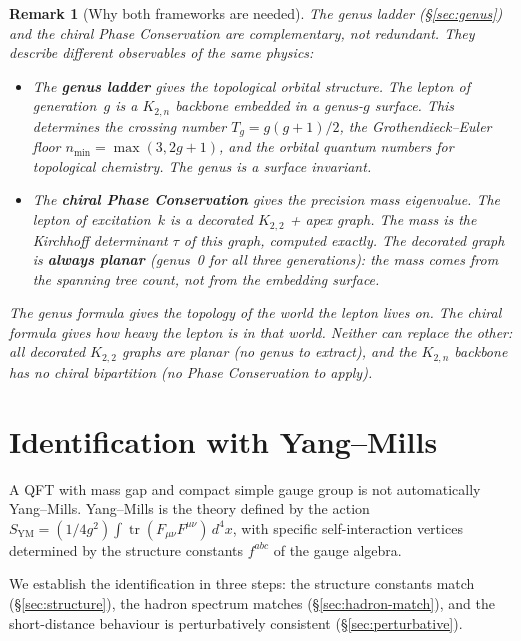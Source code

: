 \documentclass[11pt]{article}
\newtheorem{remark}[theorem]{Remark}
\newcommand{\Ktwo}[1]{K_{2,#1}}
\DeclareMathOperator{\tr}{tr}
\begin{document}
\begin{remark}[Why both frameworks are needed]
\label{rem:complement}
The genus ladder (\S\ref{sec:genus}) and the chiral Phase
Conservation are \emph{complementary}, not redundant.
They describe different observables of the same physics:
\begin{itemize}
\item The \textbf{genus ladder} gives the \emph{topological
  orbital structure}.  The lepton of generation~$g$ is a
  $\Ktwo{n}$ backbone embedded in a genus-$g$ surface.
  This determines the crossing number $T_g = g(g+1)/2$,
  the Grothendieck--Euler floor $n_{\min} = \max(3, 2g+1)$,
  and the orbital quantum numbers for topological chemistry.
  The genus is a \emph{surface} invariant.

\item The \textbf{chiral Phase Conservation} gives the
  \emph{precision mass eigenvalue}.  The lepton of
  excitation~$k$ is a decorated $K_{2,2}$ + apex graph.
  The mass is the Kirchhoff determinant $\tau$ of this
  graph, computed exactly.  The decorated graph is
  \textbf{always planar} (genus~0 for all three
  generations): the mass comes from the spanning tree
  count, not from the embedding surface.
\end{itemize}
The genus formula gives the topology of the world the lepton
lives on.  The chiral formula gives how heavy the lepton is
in that world.  Neither can replace the other: all decorated
$K_{2,2}$ graphs are planar (no genus to extract), and the
$\Ktwo{n}$ backbone has no chiral bipartition (no Phase
Conservation to apply).
\end{remark}

\section{Identification with Yang--Mills}
\label{sec:ym-id}

A QFT with mass gap and compact simple gauge group is not
automatically Yang--Mills.  Yang--Mills is the theory defined
by the action
$S_{\mathrm{YM}} = (1/4g^2) \int \tr(F_{\mu\nu}F^{\mu\nu})\,d^4x$,
with specific self-interaction vertices determined by the
structure constants $f^{abc}$ of the gauge algebra.

We establish the identification in three steps:
the structure constants match (\S\ref{sec:structure}),
the hadron spectrum matches (\S\ref{sec:hadron-match}), and
the short-distance behaviour is perturbatively consistent
(\S\ref{sec:perturbative}).
\end{document}
